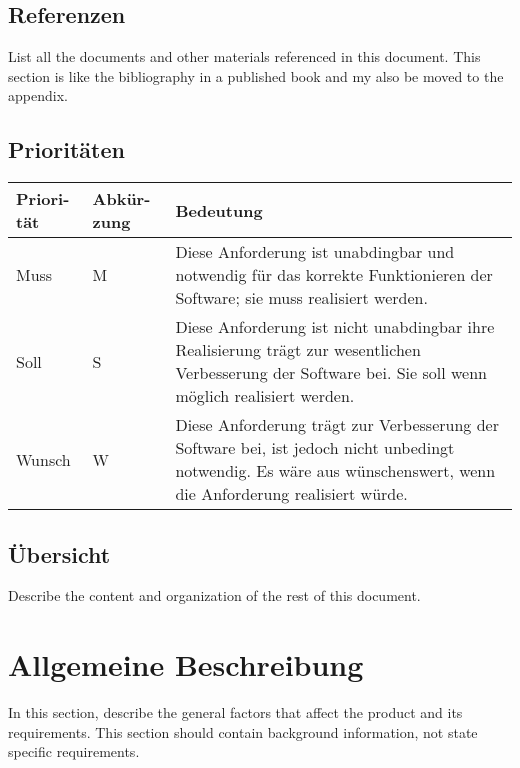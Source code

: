 \subsection{Referenzen}
List all the documents and other materials referenced in this document. This section is like the bibliography in a published book and my also be moved to the appendix.

\subsection{Prioritäten}

\begin{tabular}{| p{1.5cm} | p{2cm} | p{10cm} |}


\hline
\textbf{Priori-} \newline \textbf{tät} & 
\textbf{Abkür-} \newline \textbf{zung} & 
\textbf{Bedeutung} \\
\hline

Muss & 
M & 
Diese Anforderung ist unabdingbar und notwendig für das korrekte Funktionieren der Software; sie muss realisiert werden. \\
\hline

Soll &
S &
Diese Anforderung ist nicht unabdingbar ihre Realisierung trägt zur wesentlichen Verbesserung der Software bei. Sie soll wenn möglich realisiert werden. \\
\hline

Wunsch &
W &
Diese Anforderung trägt zur Verbesserung der Software bei, ist jedoch nicht unbedingt notwendig. Es wäre aus wünschenswert, wenn die Anforderung realisiert würde. \\
\hline

\end{tabular}

\subsection{Übersicht}
Describe the content and organization of the rest of this document.

\newpage

\section{Allgemeine Beschreibung}
In this section, describe the general factors that affect the product and its requirements. This section should contain background information, not state specific requirements.

